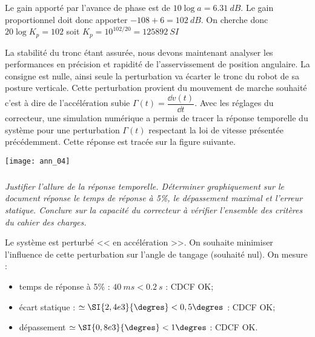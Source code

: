 \begin{multicols}{2}
\begin{corrige}
Le gain apporté par l'avance de phase est de $10\log a=\SI{6,31}{dB}$. Le gain proportionnel doit donc apporter $-108+6=\SI{102}{dB}$. On cherche donc $20\log K_p = 102$ soit $K_p = 10^{102/20}=\SI{125892}{SI}$
\end{corrige}
\else
\fi
\ifprof
\else
La stabilité du tronc étant assurée, nous devons maintenant analyser les performances en précision et rapidité
de l'asservissement de position angulaire. La consigne est nulle, ainsi seule la perturbation va écarter le tronc
du robot de sa posture verticale. Cette perturbation provient du mouvement de marche souhaité c'est à dire de
l'accélération subie $\Gamma(t)=\dfrac{\dd v(t)}{\dd t}$. Avec les réglages du correcteur, une simulation numérique a permis de tracer la réponse temporelle du système pour une perturbation $\Gamma(t)$ respectant la loi de vitesse présentée précédemment.
Cette réponse est tracée sur la figure suivante.

\begin{center}
\texttt{[image: ann\_04]}
\end{center}
\fi


\subparagraph{} \textit{Justifier l'allure de la réponse temporelle. Déterminer graphiquement sur le document réponse le temps de réponse à 5\%, le dépassement maximal et l'erreur statique. Conclure sur la capacité du correcteur à
vérifier l'ensemble des critères du cahier des charges.}
\ifprof
\begin{corrige}
Le système est perturbé << en accélération >>. On souhaite minimiser l'influence de cette perturbation sur l'angle de tangage (souhaité nul).
On mesure : 
\begin{itemize}
\item temps de réponse à 5\% : $\SI{40}{ms} <\SI{0,2}{s}$ : CDCF OK;
\item écart statique : $\simeq \SI{2,4e3}{\degres} <0,5\degres$ : CDCF OK;
\item dépassement $\simeq \SI{0,8e3}{\degres} <1\degres$ : CDCF OK.
\end{itemize}
\end{corrige}
\else
\fi



\ifprof
\else
\end{multicols}
\fi

